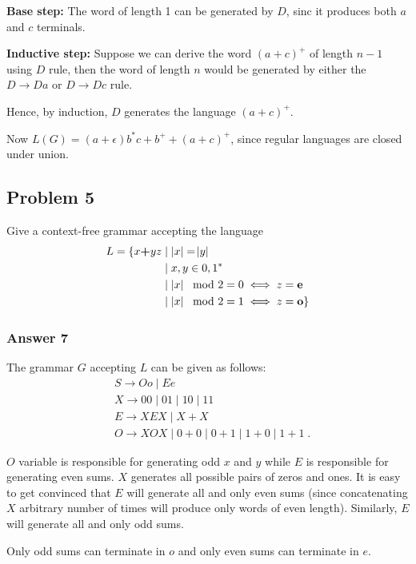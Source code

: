 \documentclass[11pt]{article}
\begin{document}
\textbf{Base step:} The word of length 1 can be generated by \(D\), sinc it produces
both \(a\) and \(c\) terminals.

\textbf{Inductive step:} Suppose we can derive the word \((a+c)^+\) of length \(n-1\)
using \(D\) rule, then the word of length \(n\) would be generated by either
the \(D \to Da\) or \(D \to Dc\) rule.

Hence, by induction, \(D\) generates the language \((a+c)^+\).

Now \(L(G)=(a+\epsilon)b^*c+b^++(a+c)^+\), since regular languages are closed
under union.

\subsection{Problem 5}
\label{sec:orgheadline12}
Give a context-free grammar accepting the language
\begin{align*}
  L = \{ x\textbf{+}yz \;| &\; \abs{x} = \abs{y} \\
                         | &\; x, y \in {0, 1}^* \\
                         | &\; \abs{x} \mod 2 = 0 \iff z = \textbf{e} \\
                         | &\; \abs{x} \mod 2 = 1 \iff z = \textbf{o} \}
\end{align*}

\subsubsection{Answer 7}
\label{sec:orgheadline11}
The grammar \(G\) accepting \(L\) can be given as follows:
\begin{align*}
  &S \to Oo \;|\; Ee \\
  &X \to 00 \;|\; 01 \;|\; 10 \;|\; 11 \\
  &E \to XEX \;|\; X+X \\
  &O \to XOX \;|\; 0+0 \;|\; 0+1 \;|\; 1+0 \;|\; 1+1 \;.
\end{align*}


\(O\) variable is responsible for generating odd \(x\) and \(y\) while \(E\) is
responsible for generating even sums.  \(X\) generates all possible pairs of
zeros and ones.  It is easy to get convinced that \(E\) will generate all and
only even sums (since concatenating \(X\) arbitrary number of times will
produce only words of even length).  Similarly, \(E\) will generate all and
only odd sums.

Only odd sums can terminate in \(o\) and only even sums can terminate in \(e\).
\end{document}
